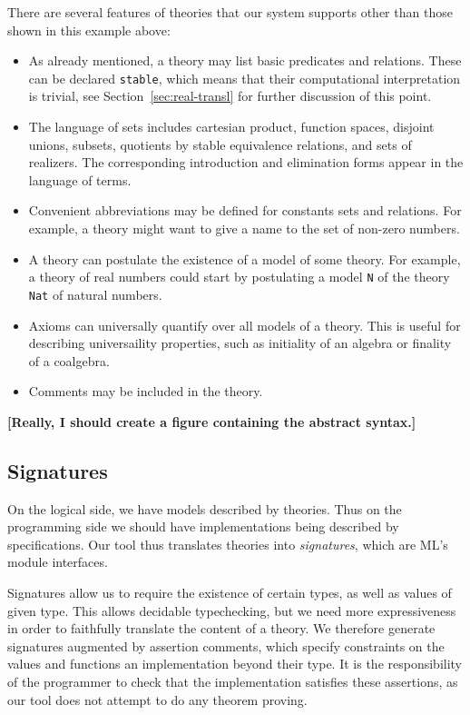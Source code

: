\documentclass{article}
\newcommand{\comment}[1]{\textbf{[#1]}}
\begin{document}
There are several features of theories that our system supports other
than those shown in this example above:
%
\begin{itemize}
\item
  As already mentioned, a theory may list basic predicates and relations.
  These can be declared \Verb|stable|, which means that their
  computational interpretation is trivial, see
  Section~\ref{sec:real-transl} for further discussion of this point.
\item The language of sets includes cartesian product, function
  spaces, disjoint unions, subsets, quotients by stable equivalence
  relations, and sets of realizers. The corresponding introduction and
  elimination forms appear in the language of terms.

\item Convenient abbreviations may be defined for constants sets and
  relations. For example, a theory might want to give a name to the
  set of non-zero numbers.

\item A theory can postulate the existence of a model of some
  theory.  For example, a theory of real numbers could start by
  postulating a model \Verb|N| of the theory \Verb|Nat| of natural
  numbers.

\item Axioms can universally quantify over all models of a theory.
  This is useful for describing universaility properties, such as
  initiality of an algebra or finality of a coalgebra.

\item Comments may be included in the theory.

\end{itemize}

\comment{Really, I should create a figure containing the abstract syntax.}

\subsection{Signatures}
\label{sec:signatures}

On the logical side, we have models described by theories.  Thus on
the programming side we should have implementations being described by
specifications.  Our tool thus translates theories into
\emph{signatures}, which are ML's module interfaces.

Signatures allow us to require the existence of certain types, as well
as values of given type.  This allows decidable typechecking, but we
need more expressiveness in order to faithfully translate the content
of a theory.  We therefore generate signatures augmented by assertion
comments, which specify constraints on the values and functions an
implementation beyond their type.  It is the responsibility of the
programmer to check that the implementation satisfies these
assertions, as our tool does not attempt to do any theorem proving.
\end{document}
